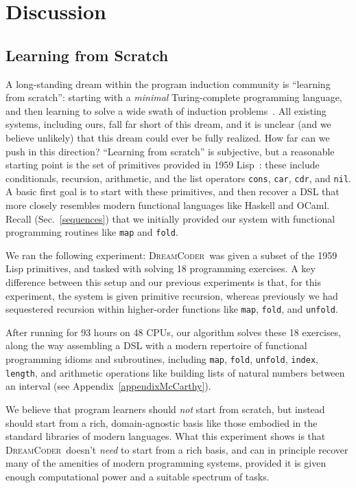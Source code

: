 \documentclass{article}
\newcommand{\system}{\textsc{DreamCoder}~}
\newcommand{\code}[1]{{\footnotesize\texttt{#1}}}
\begin{document}
\section{Discussion}

\subsection{Learning from Scratch}
A long-standing dream within the program induction community
is ``learning from scratch'': starting with a \emph{minimal} Turing-complete programming language,
and then learning to solve a wide swath of
induction problems~\cite{solomonoff1964formal,schmidhuber2004optimal,hutter2004universal,solomonoff1989system}.
All existing systems,
including ours,
fall far short of this dream,
and it is unclear (and we believe unlikely)
that this dream could ever be fully realized.
How far can we push in this direction?
``Learning from scratch'' is subjective, but a reasonable
starting point is the set of primitives provided in 1959
Lisp~\cite{mccarthy1960recursive}: these include
conditionals, recursion, arithmetic, and the 
list operators \code{cons}, \code{car}, \code{cdr}, and \code{nil}.
A  basic first goal is to start with
these primitives,
and then recover a DSL that
more closely resembles modern functional languages like Haskell and OCaml.
Recall (Sec.~\ref{sequences})
that we initially provided our system with functional programming routines like
\code{map} and \code{fold}.

We ran the following experiment: \system was given a subset of the
1959 Lisp primitives, and tasked with solving 18 programming
exercises. A key difference between this setup and our previous
experiments is that, for this experiment, the system is given
primitive recursion, whereas previously we had sequestered recursion
within higher-order functions like \code{map}, \code{fold}, and
\code{unfold}.

After running for 93 hours on 48 CPUs, our
algorithm solves these 18 exercises, along the way assembling a DSL
with a modern repertoire of
functional programming idioms and subroutines, including \code{map},
\code{fold}, \code{unfold}, \code{index}, \code{length},
and  arithmetic operations like 
building lists of natural numbers between an interval (see  Appendix~\ref{appendixMcCarthy}).

We believe that program learners should \emph{not}
start from scratch,
but instead should start from
a rich, domain-agnostic
basis like those embodied in the standard libraries of modern  languages.
What this experiment shows is that \system doesn't \emph{need} to start from a rich basis,
and can in principle recover many of the amenities of modern programming systems,
provided it is given enough computational power and a suitable
spectrum of tasks.
\end{document}
